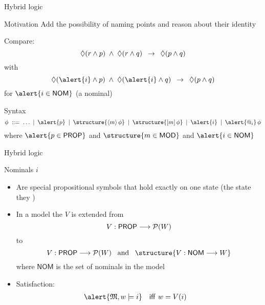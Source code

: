 \documentclass[aspectratio=169]{beamer}
\begin{document}
\begin{slide}{Hybrid logic}\label{s:46}
\small

\begin{block}{Motivation}
Add the possibility of \alert{naming} points and reason about their \alert{identity}

\vspace{0.5cm}
Compare:
\begin{equation*}
\Diamond (r \mathbin{\wedge} p)\; \mathbin{\wedge}\; \Diamond (r \mathbin{\wedge} q)\; \; \mathbin{\rightarrow}\; \; \Diamond (p \mathbin{\wedge} q)
\end{equation*}
with
\begin{equation*}
\eventual (\alert{i} \e p)\; \e\; \eventual (\alert{i} \e q)\; \; \impp\; \; \eventual (p \e q)
\end{equation*}
for $\alert{i \in \mathsf{NOM}}$ (a \alert{nominal})
\end{block}

\begin{block}{Syntax}
  \begin{equation*}
\phi\; ::=\;
    \ldots \:\mid\:
    \alert{p} \: \mid\: 
    \structure{\pv{m}{\phi}} \:  \mid\:
    \structure{\nc{m}{\phi}} \:  \mid\:
    \alert{i} \:  \mid\:
    \alert{@_i}\,\phi
\end{equation*}
where $\alert{p \in \mathsf{PROP}}$ and $\structure{m \in \mathsf{MOD}}$ and $\alert{i \in \mathsf{NOM}}$
\end{block}
\end{slide}

\begin{slide}{Hybrid logic}\label{s:47}
\small

\begin{block}{Nominals $i$}
\begin{itemize}
\item Are special propositional symbols that hold exactly on one state (the state they )
\item  In a model the  $V$ is extended from 
$$ V: \mathsf{PROP} \longrightarrow {\cal P}(W) $$
to
$$ \fdec{V}{\mathsf{PROP}}{\pow{(W)}} \; \; \; \text{and}\; \; \;  \structure{\fdec{V}{\mathsf{NOM}}{W} }$$
where $\mathsf{NOM}$ is the set of nominals in the model
\item Satisfaction:
\begin{align*}
\alert{\ger{M}, w  \models  i} &&  \text{\textsf{iff} }  & w = V(i)
\end{align*}
\end{itemize}
\end{block}


\end{slide}
\end{document}
